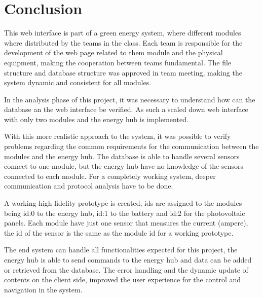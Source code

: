 \section{Conclusion}
This web interface is part of a green energy system, where different modules where distributed by the teams in the class. Each team is responsible for the development of the web page related to them module and the physical equipment, making the cooperation between teams fundamental. The file structure and database structure was approved in team meeting, making the system dynamic and consistent for all modules.

In the analysis phase of this project, it was necessary to understand how can the database an the web interface be verified. As such a scaled down web interface with only two modules and the energy hub is implemented.

With this more realistic approach to the system, it was possible to verify problems regarding the common requirements for the communication between the modules and the energy hub. The database is able to handle several sensors connect to one module, but the energy hub have no knowledge of the sensors connected to each module. For a completely working system, deeper communication and protocol analysis have to be done.

A working high-fidelity prototype is created, ids are assigned to the modules being id:0 to the energy hub, id:1 to the battery and id:2 for the photovoltaic panels. Each module have just one sensor that measures the current (ampere), the id of the sensor is the same as the module id for a working prototype.

The end system can handle all functionalities expected for this project, the energy hub is able to send commands to the energy hub and data can be added or retrieved from the database. The error handling and the dynamic update of contents on the client side, improved the user experience for the control and navigation in the system.